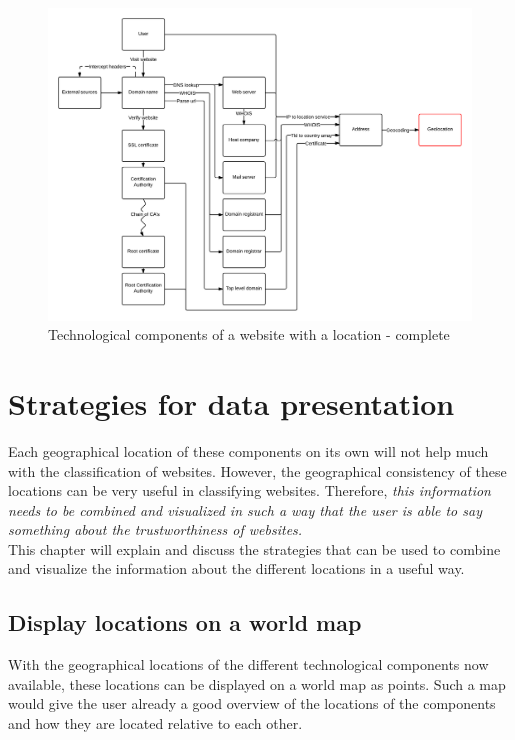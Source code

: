 \documentclass[twoside,openright,notitlepage]{uva-bachelor-thesis}
\begin{document}
\begin{figure}[h!]
    \centering
    \includegraphics[width=1.3\textwidth,center]{img/components_new.png}%
    \caption{Technological components of a website with a location - complete}
    \label{fig:components_full}
\end{figure}

\FloatBarrier
\chapter{Strategies for data presentation}
Each geographical location of these components on its own will not help much with the classification of websites. However, the geographical consistency of these locations can be very useful in classifying websites. Therefore, \emph{this information needs to be combined and visualized in such a way that the user is able to say something about the trustworthiness of websites.} \\

This chapter will explain and discuss the strategies that can be used to combine and visualize the information about the different locations in a useful way.

\section{Display locations on a world map}
With the geographical locations of the different technological components now available, these locations can be displayed on a world map as points. Such a map would give the user already a good overview of the locations of the components and how they are located relative to each other.\\
\end{document}
